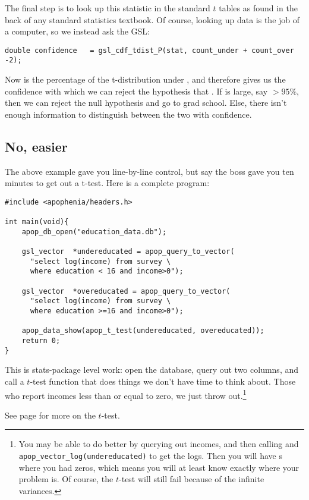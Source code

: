 The final step is to look up this statistic in the standard $t$ tables
as found in the back of any standard statistics textbook. Of course,
looking up data is the job of a computer, so we instead ask the GSL:
\begin{lstlisting}
double confidence   = gsl_cdf_tdist_P(stat, count_under + count_over -2);
\end{lstlisting}
Now  is the percentage of the t-distribution under
, and therefore gives us the confidence with which we can
reject the hypothesis that . If
 is large, say $> 95\%$, then we can reject the null
hypothesis and go to grad school. Else, there isn't enough information
to distinguish between the two with confidence.

\subsection{No, easier} The above example gave you line-by-line
control, but say the boss gave you ten minutes to get out a
t-test. Here is a complete program:

\begin{lstlisting}
#include <apophenia/headers.h>

int main(void){
    apop_db_open("education_data.db");

    gsl_vector	*undereducated = apop_query_to_vector(
      "select log(income) from survey \
      where education < 16 and income>0");

    gsl_vector	*overeducated = apop_query_to_vector(
      "select log(income) from survey \
      where education >=16 and income>0");

    apop_data_show(apop_t_test(undereducated, overeducated));
    return 0;
}
\end{lstlisting}

This is stats-package level work: open the database, query out two
columns, and call a $t$-test function that does things
we don't have time to think about. Those who report incomes less than or
equal to zero, we just throw out.\footnote{You may be able to do better
by querying out incomes, and then calling
    \cinline{apop\_vector\_log(overeducated)} and {\tt
    apop\_vector\_log(undereducated)} to get the logs. Then you will have
    \cinline{GSL\_NEGINF}s where you had zeros, which means you will at least
    know exactly where your problem is. Of course, the $t$-test will
    still fail because of the infinite variances.}

See page \pageref{ttest} for more on the $t$-test.

\setc %
